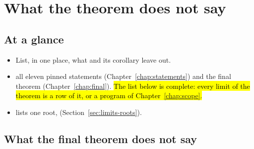 \chapter{What the theorem does not say}\label{chap:limits}

\section*{At a glance}
\begin{itemize}
\item {} List, in one place, what  and its corollary leave out.
\item {} \stProved{} all eleven pinned statements (Chapter~\ref{chap:statements}) and the final theorem (Chapter~\ref{chap:final}). \hl{The list below is complete: every limit of the theorem is a row of it, or a program of Chapter~\ref{chap:scope}.}
\item {}  lists one root,  (Section~\ref{sec:limits-roots}).
\end{itemize}

\section{What the final theorem does not say}\label{sec:limits-notsay}

